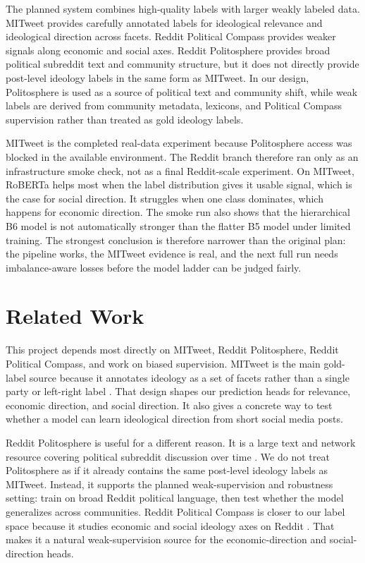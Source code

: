 \documentclass[11pt,twocolumn]{article}
\begin{document}
The planned system combines high-quality labels with larger weakly labeled data. MITweet provides carefully annotated labels for ideological relevance and ideological direction across facets. Reddit Political Compass provides weaker signals along economic and social axes. Reddit Politosphere provides broad political subreddit text and community structure, but it does not directly provide post-level ideology labels in the same form as MITweet. In our design, Politosphere is used as a source of political text and community shift, while weak labels are derived from community metadata, lexicons, and Political Compass supervision rather than treated as gold ideology labels.

MITweet is the completed real-data experiment because Politosphere access was blocked in the available environment. The Reddit branch therefore ran only as an infrastructure smoke check, not as a final Reddit-scale experiment. On MITweet, RoBERTa helps most when the label distribution gives it usable signal, which is the case for social direction. It struggles when one class dominates, which happens for economic direction. The smoke run also shows that the hierarchical B6 model is not automatically stronger than the flatter B5 model under limited training. The strongest conclusion is therefore narrower than the original plan: the pipeline works, the MITweet evidence is real, and the next full run needs imbalance-aware losses before the model ladder can be judged fairly.

\section{Related Work}

This project depends most directly on MITweet, Reddit Politosphere, Reddit Political Compass, and work on biased supervision. MITweet is the main gold-label source because it annotates ideology as a set of facets rather than a single party or left-right label \cite{liu-etal-2023-ideology}. That design shapes our prediction heads for relevance, economic direction, and social direction. It also gives a concrete way to test whether a model can learn ideological direction from short social media posts.

Reddit Politosphere is useful for a different reason. It is a large text and network resource covering political subreddit discussion over time \cite{hofmann-etal-2022-politosphere}. We do not treat Politosphere as if it already contains the same post-level ideology labels as MITweet. Instead, it supports the planned weak-supervision and robustness setting: train on broad Reddit political language, then test whether the model generalizes across communities. Reddit Political Compass is closer to our label space because it studies economic and social ideology axes on Reddit \cite{colacrai-etal-2024-politicalcompass}. That makes it a natural weak-supervision source for the economic-direction and social-direction heads.
\end{document}
